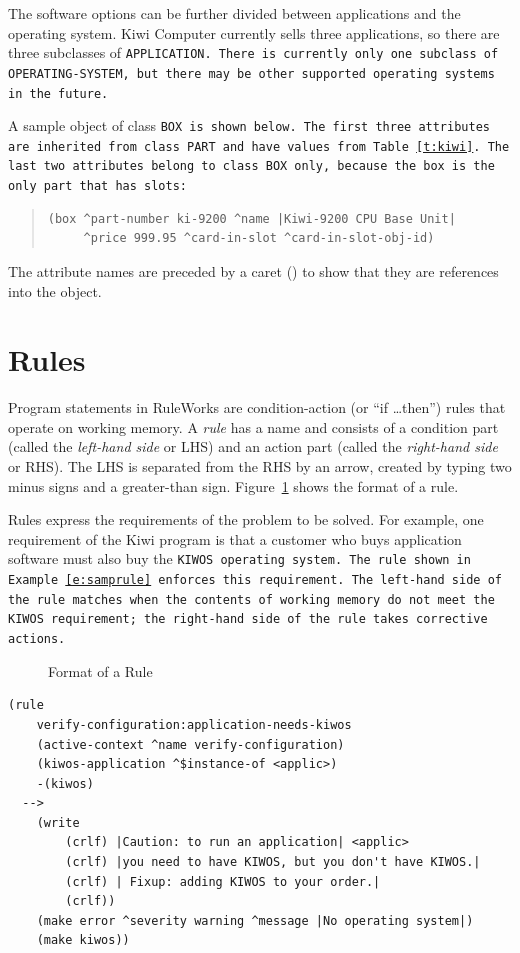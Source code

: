 The software options can be further divided between applications and
the operating system. Kiwi Computer currently sells three
applications, so there are three subclasses of \tt{APPLICATION}. There
is currently only one subclass of \tt{OPERATING-SYSTEM}, but there may
be other supported operating systems in the future.

A sample object of class \tt{BOX} is shown below.  The first three
attributes are inherited from class \tt{PART} and have values from
Table~\ref{t:kiwi}. The last two attributes belong to class \tt{BOX}
only, because the box is the only part that has slots:

\begin{quote}
\begin{verbatim}
(box ^part-number ki-9200 ^name |Kiwi-9200 CPU Base Unit| 
     ^price 999.95 ^card-in-slot ^card-in-slot-obj-id)
\end{verbatim}
\end{quote}

The attribute names are preceded by a caret (\ct) to show that they
are references into the object.

\section{Rules}

Program statements in RuleWorks are condition-action (or ``if
\ldots{}then'') rules that operate on working memory. A \emph{rule}
has a name and consists of a condition part (called the
\emph{left-hand side} or LHS) and an action part (called the
\emph{right-hand side} or RHS). The LHS is separated from the RHS by
an arrow, created by typing two minus signs and a greater-than
sign. Figure~\ref{f:1-2} shows the format of a rule.

Rules express the requirements of the problem to be solved. For
example, one requirement of the Kiwi program is that a customer who
buys application software must also buy the \tt{KIWOS} operating
system. The rule shown in Example~\ref{e:samprule} enforces this
requirement. The left-hand side of the rule matches when the contents
of working memory do not meet the \tt{KIWOS} requirement; the
right-hand side of the rule takes corrective actions.

\begin{figure}[h]
  \centering
  
  \caption{Format of a Rule}
  \label{f:1-2}
\end{figure}

\begin{exampl}
\begin{verbatim}
(rule
    verify-configuration:application-needs-kiwos
    (active-context ^name verify-configuration)
    (kiwos-application ^$instance-of <applic>)
    -(kiwos)
  -->
    (write
        (crlf) |Caution: to run an application| <applic>
        (crlf) |you need to have KIWOS, but you don't have KIWOS.|
        (crlf) | Fixup: adding KIWOS to your order.|
        (crlf))
    (make error ^severity warning ^message |No operating system|)
    (make kiwos))
\end{verbatim}
\label{e:samprule}
\end{exampl}

